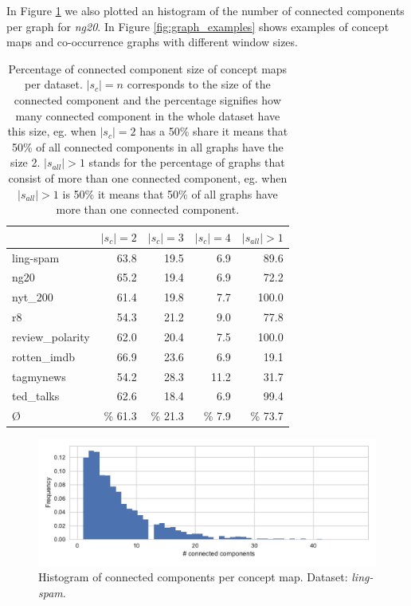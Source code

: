 In Figure \ref{fig:histogram_connected_components} we also plotted an histogram of the number of connected components per graph for \textit{ng20}.
In Figure \ref{fig:graph_examples} shows examples of concept maps and co-occurrence graphs with different window sizes.

\begin{table}[htb!]
\centering
\begin{tabular}{lrrrr}
\toprule
	{} &  $|s_c|=2$ &  $|s_c|=3$ &  $|s_c|=4$ & $|s_{all}| > 1$ \\
	\midrule
	ling-spam       & 63.8 & 19.5 & 6.9 & 89.6 \\
	ng20            & 65.2 & 19.4 & 6.9 & 72.2 \\
	nyt\_200         & 61.4 & 19.8 & 7.7 & 100.0 \\
	r8              & 54.3 & 21.2 & 9.0 & 77.8 \\
	review\_polarity & 62.0 & 20.4 & 7.5 & 100.0 \\
	rotten\_imdb     & 66.9 & 23.6 & 6.9 & 19.1 \\
	tagmynews       & 54.2 & 28.3 & 11.2 & 31.7 \\
	ted\_talks       & 62.6 & 18.4 & 6.9 & 99.4 \\
	\midrule
	\O            & \% 61.3 & \% 21.3 & \% 7.9 & \% 73.7 \\
	\bottomrule
\end{tabular}
\caption[Statistics: Percentage of connected components size]{Percentage of connected component size of concept maps per dataset. $|s_c|=n$ corresponds to the size of the connected component and the percentage signifies how many connected component in the whole dataset have this size, eg. when $|s_c|=2$ has a 50\% share it means that 50\% of all connected components in all graphs have the size 2. $|s_{all}| > 1$ stands for the percentage of graphs that consist of more than one connected component, eg. when $|s_{all}| > 1$ is 50\% it means that 50\% of all graphs have more than one connected component.}\label{table:connected_component_percentage_per_size}
\end{table}

\begin{figure}[htb!]
\centering
\includegraphics[width=0.8\linewidth]{assets/figures/hist-connected-components-ling-spam-CMap.pdf}
\caption[Statistics: Histogram of connected components per concept map]{Histogram of connected components per concept map. Dataset: \textit{ling-spam}.}\label{fig:histogram_connected_components}
\end{figure}

